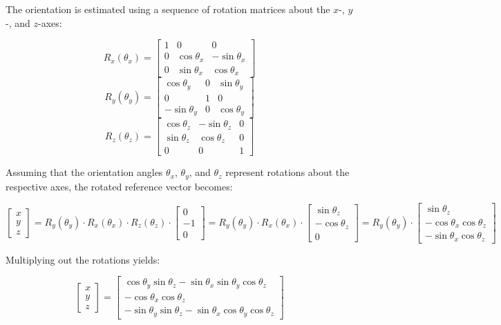 \documentclass{article}
\begin{document}
The orientation is estimated using a sequence of rotation matrices about the $x$-, $y$-, and $z$-axes:

\[
R_x(\theta_x) =
\begin{bmatrix}
1 & 0 & 0 \\
0 & \cos\theta_x & -\sin\theta_x \\
0 & \sin\theta_x & \cos\theta_x
\end{bmatrix}\]
\[R_y(\theta_y) =
\begin{bmatrix}
\cos\theta_y & 0 & \sin\theta_y \\
0 & 1 & 0 \\
-\sin\theta_y & 0 & \cos\theta_y
\end{bmatrix}\]
\[R_z(\theta_z) =
\begin{bmatrix}
\cos\theta_z & -\sin\theta_z & 0 \\
\sin\theta_z & \cos\theta_z & 0 \\
0 & 0 & 1
\end{bmatrix}
\]

Assuming that the orientation angles $\theta_x$, $\theta_y$, and $\theta_z$ represent rotations about the respective axes, the rotated reference vector becomes:

\[
\begin{bmatrix}
x\\
y\\
z
\end{bmatrix}
=
R_y(\theta_y) \cdot R_x(\theta_x) \cdot R_z(\theta_z) \cdot
\begin{bmatrix}
0\\
-1\\
0
\end{bmatrix}
=
R_y(\theta_y) \cdot R_x(\theta_x) \cdot
\begin{bmatrix}
\sin\theta_z\\
-\cos\theta_z\\
0
\end{bmatrix}
=
R_y(\theta_y) \cdot
\begin{bmatrix}
\sin\theta_z\\
-\cos\theta_x \cos\theta_z\\
-\sin\theta_x \cos\theta_z
\end{bmatrix}
\]

Multiplying out the rotations yields:

\[
\begin{bmatrix}
x\\
y\\
z
\end{bmatrix}
=
\begin{bmatrix}
\cos\theta_y \sin\theta_z - \sin\theta_x \sin\theta_y \cos\theta_z \\
-\cos\theta_x \cos\theta_z \\
-\sin\theta_y \sin\theta_z - \sin\theta_x \cos\theta_y \cos\theta_z
\end{bmatrix}
\]
\end{document}
